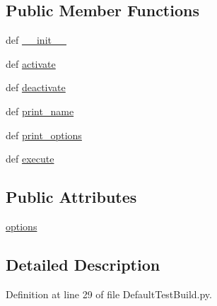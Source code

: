 \subsection*{Public Member Functions}
\begin{DoxyCompactItemize}
\item 
def \hyperlink{class_default_test_build_1_1_default_test_build_a08729e27591861a8c9b61a6b2618ec2f}{\-\_\-\-\_\-init\-\_\-\-\_\-}
\item 
def \hyperlink{class_default_test_build_1_1_default_test_build_a88b530e5d66e5dc310f77087d8744345}{activate}
\item 
def \hyperlink{class_default_test_build_1_1_default_test_build_a3a1fbc64d9a4750d7ecf722fb6bcd1ce}{deactivate}
\item 
def \hyperlink{class_default_test_build_1_1_default_test_build_a391c37a5d652ad857c57ae07b66b0d7e}{print\-\_\-name}
\item 
def \hyperlink{class_default_test_build_1_1_default_test_build_a38238916f0726d3a8e2b352ddc74f424}{print\-\_\-options}
\item 
def \hyperlink{class_default_test_build_1_1_default_test_build_a17ce5f679320871748b5aa3ea3491c28}{execute}
\end{DoxyCompactItemize}
\subsection*{Public Attributes}
\begin{DoxyCompactItemize}
\item 
\hyperlink{class_default_test_build_1_1_default_test_build_a2c22896be00540cc15625e79bc98c9fc}{options}
\end{DoxyCompactItemize}


\subsection{Detailed Description}


Definition at line 29 of file Default\-Test\-Build.\-py.



